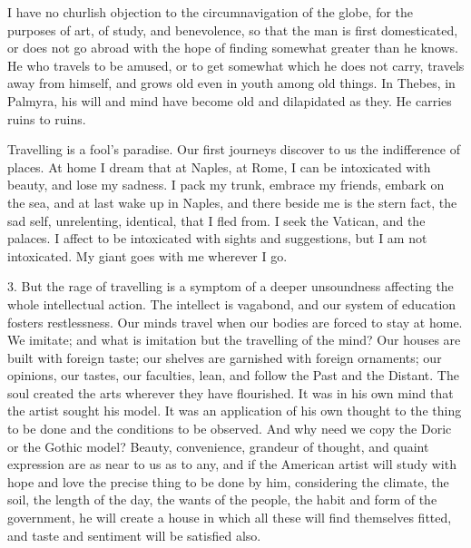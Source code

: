 \documentclass[12pt]{article}
\begin{document}
I have no churlish objection to the circumnavigation of the globe, for the
purposes of art, of study, and benevolence, so that the man is first
domesticated, or does not go abroad with the hope of finding somewhat
greater than he knows. He who travels to be amused, or to get somewhat which
he does not carry, travels away from himself, and grows old even in youth
among old things. In Thebes, in Palmyra, his will and mind have become old
and dilapidated as they. He carries ruins to ruins.

Travelling is a fool's paradise. Our first journeys discover to us the
indifference of places. At home I dream that at Naples, at Rome, I can be
intoxicated with beauty, and lose my sadness. I pack my trunk, embrace my
friends, embark on the sea, and at last wake up in Naples, and there beside
me is the stern fact, the sad self, unrelenting, identical, that I fled
from. I seek the Vatican, and the palaces. I affect to be intoxicated with
sights and suggestions, but I am not intoxicated. My giant goes with me
wherever I go.

3. But the rage of travelling is a symptom of a deeper unsoundness affecting
the whole intellectual action. The intellect is vagabond, and our system of
education fosters restlessness. Our minds travel when our bodies are forced
to stay at home. We imitate; and what is imitation but the travelling of the
mind? Our houses are built with foreign taste; our shelves are garnished
with foreign ornaments; our opinions, our tastes, our faculties, lean, and
follow the Past and the Distant. The soul created the arts wherever they
have flourished. It was in his own mind that the artist sought his model. It
was an application of his own thought to the thing to be done and the
conditions to be observed. And why need we copy the Doric or the Gothic
model? Beauty, convenience, grandeur of thought, and quaint expression are
as near to us as to any, and if the American artist will study with hope and
love the precise thing to be done by him, considering the climate, the soil,
the length of the day, the wants of the people, the habit and form of the
government, he will create a house in which all these will find themselves
fitted, and taste and sentiment will be satisfied also.
\end{document}

